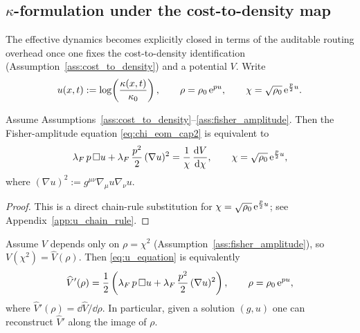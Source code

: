 \subsection{\texorpdfstring{$\kappa$}{kappa}-formulation under the cost-to-density map}
\label{subsec:kappa_formulation}

The effective dynamics becomes explicitly closed in terms of the auditable routing overhead once one fixes the cost-to-density identification (Assumption~\ref{ass:cost_to_density}) and a potential $V$.
Write
\begin{equation}
  u(x,t):=\log\!\left(\frac{\kappa(x,t)}{\kappa_0}\right),
  \qquad
  \rho=\rho_0\,\mathrm{e}^{p u},
  \qquad
  \chi=\sqrt{\rho_0}\,\mathrm{e}^{\frac{p}{2}u}.
  \label{eq:u_rho_chi_kappa}
\end{equation}

\begin{proposition}[Closed scalar equation for $u=\log(\kappa/\kappa_0)$]
\label{prop:u_equation}
Assume Assumptions~\ref{ass:cost_to_density}--\ref{ass:fisher_amplitude}.
Then the Fisher-amplitude equation \eqref{eq:chi_eom_cap2} is equivalent to
\begin{equation}
  \lambda_F\,p\,\square u + \lambda_F\,\frac{p^2}{2}\,(\nabla u)^2
  = \frac{1}{\chi}\,\frac{\mathrm{d} V}{\mathrm{d}\chi},
  \qquad \chi=\sqrt{\rho_0}\,\mathrm{e}^{\frac{p}{2}u},
  \label{eq:u_equation}
\end{equation}
where $(\nabla u)^2:=g^{\mu\nu}\nabla_\mu u\nabla_\nu u$.
\begin{proof}
This is a direct chain-rule substitution for $\chi=\sqrt{\rho_0}\,\mathrm{e}^{\frac{p}{2}u}$; see Appendix~\ref{app:u_chain_rule}.
\end{proof}
\end{proposition}

\begin{proposition}
\label{prop:potential_reconstruction}
Assume $V$ depends only on $\rho=\chi^2$ (Assumption~\ref{ass:fisher_amplitude}), so $V(\chi^2)=\widehat V(\rho)$.
Then \eqref{eq:u_equation} is equivalently
\begin{equation}
  \widehat V'(\rho)
  = \frac12\left(\lambda_F\,p\,\square u + \lambda_F\,\frac{p^2}{2}\,(\nabla u)^2\right),
  \qquad \rho=\rho_0\,\mathrm{e}^{p u},
  \label{eq:Vprime_reconstruction}
\end{equation}
where $\widehat V'(\rho)=\dd\widehat V/\dd\rho$.
In particular, given a solution $(g,u)$ one can reconstruct $\widehat V'$ along the image of $\rho$.
\end{proposition}

